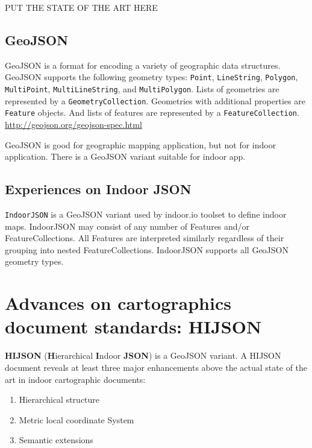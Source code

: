 \documentclass{sig-alternate}
\begin{document}
PUT THE STATE OF THE ART HERE

\subsection{GeoJSON}\label{geojson}

GeoJSON is a format for encoding a variety of geographic data
structures. GeoJSON supports the following geometry types:
\texttt{Point}, \texttt{LineString}, \texttt{Polygon},
\texttt{MultiPoint}, \texttt{MultiLineString}, and
\texttt{MultiPolygon}. Lists of geometries are represented by a
\texttt{GeometryCollection}. Geometries with additional properties are
\texttt{Feature} objects. And lists of features are represented by a
\texttt{FeatureCollection}.
\href{GeoJSON\%20spec}{http://geojson.org/geojson-spec.html}

GeoJSON is good for geographic mapping application, but not for indoor
application. There is a GeoJSON variant suitable for indoor app.

\subsection{Experiences on Indoor
JSON}\label{experiences-on-indoor-json}

\texttt{IndoorJSON} is a GeoJSON variant used by indoor.io toolset to
define indoor maps. IndoorJSON may consist of any number of Features
and/or FeatureCollections. All Features are interpreted similarly
regardless of their grouping into nested FeatureCollections. IndoorJSON
supports all GeoJSON geometry types.

\section{Advances on cartographics document standards:
HIJSON}\label{advances-on-cartographics-document-standards-hijson}

\textbf{HIJSON} (\textbf{H}ierarchical \textbf{I}ndoor \textbf{JSON}) is
a GeoJSON variant. A HIJSON document reveals at least three major
enhancements above the actual state of the art in indoor cartographic
documents:

\begin{enumerate}
\def\labelenumi{\arabic{enumi}.}
\itemsep1pt\parskip0pt
\item
  Hierarchical structure
\item
  Metric local coordinate System
\item
  Semantic extensions
\end{enumerate}
\end{document}
